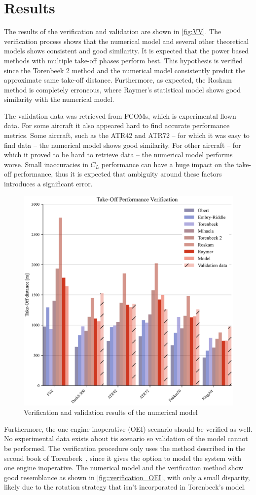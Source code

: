 \section{Results}\label{sec:VVresults}
The results of the verification and validation are shown in \autoref{fig:VV}. The verification process shows that the numerical model and several other theoretical models shows consistent and good similarity. It is expected that the power based methods with multiple take-off phases perform best. This hypothesis is verified since the Torenbeek 2 method and the numerical model consistently predict the approximate same take-off distance. Furthermore, as expected, the Roskam method is completely erroneous, where Raymer's statistical model shows good similarity with the numerical model.

The validation data was retrieved from FCOMs, which is experimental flown data. For some aircraft it also appeared hard to find accurate performance metrics. Some aircraft, such as the ATR42 and ATR72 -- for which it was easy to find data -- the numerical model shows good similarity. For other aircraft -- for which it proved to be hard to retrieve data -- the numerical model performs worse. Small inaccuracies in $C_L$ performance can have a huge impact on the take-off performance, thus it is expected that ambiguity around these factors introduces a significant error.

\begin{figure}[!ht]
    \centering
    \includegraphics[width=0.5\linewidth]{figures/VERIFICATION.png}
    \caption{Verification and validation results of the numerical model}
    \label{fig:VV}
\end{figure}

Furthermore, the one engine inoperative (OEI) scenario should be verified as well. No experimental data exists about tis scenario so validation of the model cannot be performed. The verification procedure only uses the method described in the second book of Torenbeek~\cite{torenbeek2013advanced}, since it gives the option to model the system with one engine inoperative. The numerical model and the verification method show good resemblance as shown in \autoref{fig::verification_OEI}, with only a small disparity, likely due to the rotation strategy that isn't incorporated in Torenbeek's model. 

